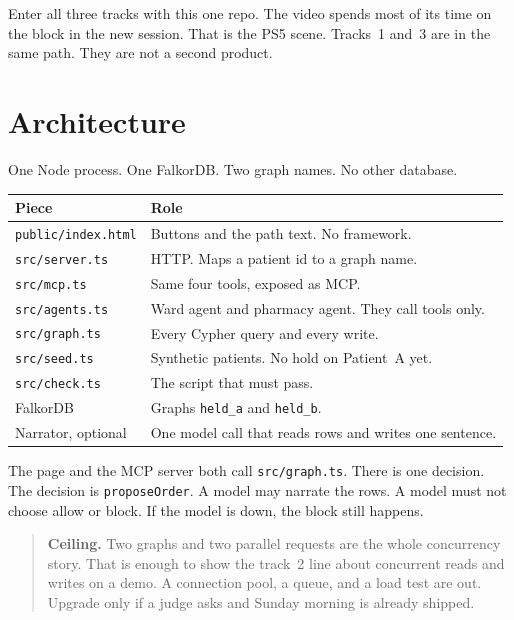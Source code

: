 \documentclass[11pt,a4paper]{article}
\newcommand{\code}[1]{\texttt{#1}}
\newcommand{\file}[1]{\texttt{#1}}
\begin{document}
Enter all three tracks with this one repo. The video spends most of its time on the block in the new session. That is the PS5 scene. Tracks~1 and~3 are in the same path. They are not a second product.

\section{Architecture}

One Node process. One FalkorDB. Two graph names. No other database.

\begin{center}
\begin{tabular}{@{}ll@{}}
\toprule
\textbf{Piece} & \textbf{Role} \\
\midrule
\file{public/index.html} & Buttons and the path text. No framework. \\
\file{src/server.ts} & HTTP. Maps a patient id to a graph name. \\
\file{src/mcp.ts} & Same four tools, exposed as MCP. \\
\file{src/agents.ts} & Ward agent and pharmacy agent. They call tools only. \\
\file{src/graph.ts} & Every Cypher query and every write. \\
\file{src/seed.ts} & Synthetic patients. No hold on Patient~A yet. \\
\file{src/check.ts} & The script that must pass. \\
FalkorDB & Graphs \code{held\_a} and \code{held\_b}. \\
Narrator, optional & One model call that reads rows and writes one sentence. \\
\bottomrule
\end{tabular}
\end{center}

The page and the MCP server both call \file{src/graph.ts}.
There is one decision. The decision is \code{proposeOrder}.
A model may narrate the rows. A model must not choose allow or block.
If the model is down, the block still happens.

\begin{quote}
\textbf{Ceiling.}
Two graphs and two parallel requests are the whole concurrency story.
That is enough to show the track~2 line about concurrent reads and writes on a demo.
A connection pool, a queue, and a load test are out. Upgrade only if a judge asks and Sunday morning is already shipped.
\end{quote}
\end{document}
